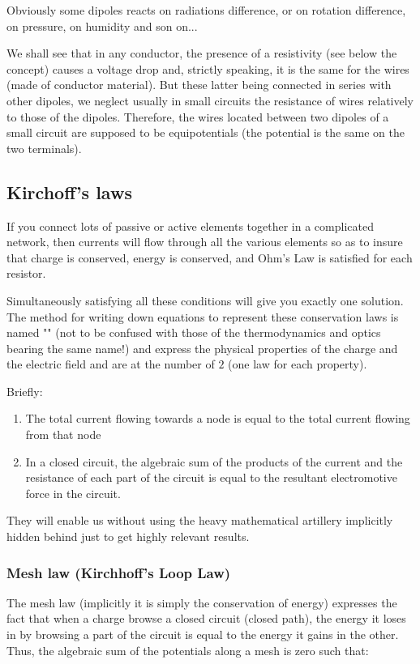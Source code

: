 	Obviously some dipoles reacts on radiations difference, or on rotation difference, on pressure, on humidity and son on...
	
	We shall see that in any conductor, the presence of a resistivity (see below the concept) causes a voltage drop and, strictly speaking, it is the same for the wires (made of conductor material). But these latter being connected in series with other dipoles, we neglect usually in small circuits the resistance of wires relatively to those of the dipoles. Therefore, the wires located between two dipoles of a small circuit are supposed to be equipotentials (the potential is the same on the two terminals).
	
	\subsection{Kirchoff's laws}
	If you connect lots of passive or active elements together in a complicated network, then currents will flow through all the various elements so as to insure that charge is conserved, energy is conserved, and Ohm's Law is satisfied for each resistor.
	
	Simultaneously satisfying all these conditions will give you exactly one solution. The method for writing down equations to represent these conservation laws is named "" (not to be confused with those of the thermodynamics and optics bearing the same name!) and express the physical properties of the charge and the electric field and are at the number of $2$ (one law for each property).
	
	Briefly:
	\begin{enumerate}
		\item The total current flowing towards a node is equal to the total current flowing from that node
		
		\item In a closed circuit, the algebraic sum of the products of the current and the resistance of each part of the circuit is equal to the resultant electromotive force in the circuit. 
	\end{enumerate}
	
	They will enable us without using the heavy mathematical artillery implicitly hidden behind just to get highly relevant results.
	
	\subsubsection{Mesh law (Kirchhoff's Loop Law)}
	The mesh law (implicitly it is simply the conservation of energy) expresses the fact that when a charge browse a closed circuit (closed path), the energy it loses in by browsing a part of the circuit is equal to the energy it gains in the other. Thus, the algebraic sum of the potentials along a mesh is zero such that:
	
